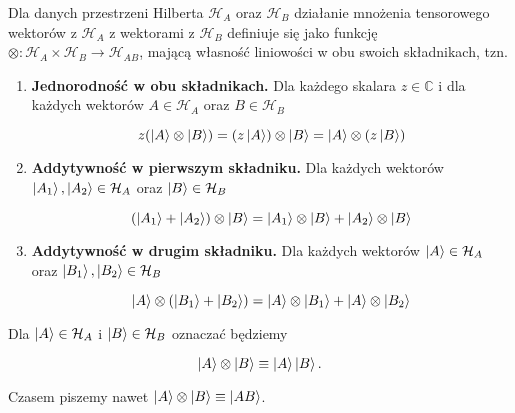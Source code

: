 \begin{definition}
    Dla danych przestrzeni Hilberta $\mathcal{H}_A$ oraz $\mathcal{H}_B$ działanie mnożenia tensorowego wektorów z $\mathcal{H}_A$ z wektorami z $\mathcal{H}_B$ definiuje się jako funkcję $\otimes: \mathcal{H}_A \times \mathcal{H}_B \rightarrow \mathcal{H}_{AB}$, mającą własność liniowości w obu swoich składnikach, tzn.

    \begin{enumerate}
        \item \textbf{Jednorodność w obu składnikach.}
            Dla każdego skalara $z \in \mathbb{C}$ i dla każdych wektorów $A \in \mathcal{H}_A$ oraz $B \in \mathcal{H}_B$

            $$
                z (\ket{A} \otimes \ket{B}) = (z \ket{A}) \otimes \ket{B} = \ket{A} \otimes (z \ket{B})
            $$
        \item \textbf{Addytywność w pierwszym składniku.}
            Dla każdych wektorów $\ket{A_1}, \ket{A_2} \in \mathcal {H}_A$ oraz $\ket{B} \in \mathcal{H}_B$

            $$
                (\ket{A_1} + \ket{A_2}) \otimes \ket{B} = \ket{A_1} \otimes \ket{B} + \ket{A_2} \otimes \ket{B}
            $$
        \item \textbf{Addytywność w drugim składniku.}
            Dla każdych wektorów $\ket{A} \in \mathcal{H}_A$ oraz $\ket{B_1}, \ket{B_2} \in \mathcal{H}_B$

            $$
                \ket{A} \otimes (\ket{B_1} + \ket{B_2}) = \ket{A} \otimes \ket{B_1} + \ket{A} \otimes \ket{B_2}
            $$
    \end{enumerate}
\end{definition}

\begin{remark}[Oznaczenia]
    Dla $\ket{A} \in \mathcal{H}_{A}$ i $\ket{B} \in \mathcal{H}_{B}$ oznaczać będziemy

    $$
        \ket{A} \otimes \ket{B} \equiv \ket{A} \ket{B}.
    $$

    Czasem piszemy nawet $\ket{A} \otimes \ket{B} \equiv \ket{A B}$.
\end{remark}

